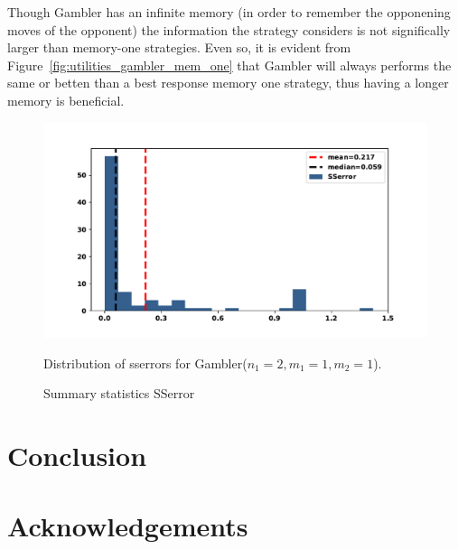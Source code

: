 \documentclass[10pt]{article}
\begin{document}
Though Gambler has an infinite memory (in order to remember the opponening
moves of the opponent) the information the strategy considers is not significally
larger than memory-one strategies. Even so, it is evident from Figure~\ref{fig:utilities_gambler_mem_one}
that Gambler will always performs the same or betten than a best response memory
one strategy, thus having a longer memory is beneficial.

\begin{figure}[!htbp]
    \begin{minipage}{0.74\textwidth}
            \begin{center}
            \includegraphics[width=\linewidth]{img/gambler_sserror.pdf}
            \end{center}
            \caption{Distribution of sserrors for Gambler($n_1 = 2,
            m_1 = 1, m_2 = 1$).}
            \label{fig:sserror_gambler}
    \end{minipage}
    \begin{minipage}{0.24\textwidth}
        \centering
        \captionsetup{type=table}
        \resizebox{.75\columnwidth}{!}{%
            }
            \caption{Summary statistics SSerror}
            \label{table:sserror_stats}
      \end{minipage}
\end{figure}

\section{Conclusion}


\section{Acknowledgements}
\end{document}
